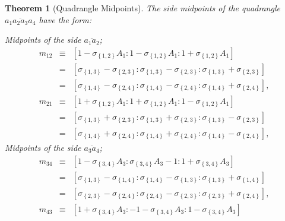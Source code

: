\documentclass{unswthesis}
\newtheorem{theorem}{Theorem}
\begin{document}
\begin{theorem}[Quadrangle Midpoints]
The side midpoints of the quadrangle $\overline{a_{1}a_{2}a_{3}a_{4}}$ have
the form:

Midpoints of the side $\overline{a_{1}a_{2}}$;%
\begin{eqnarray*}
m_{12} &\equiv &\left[ 1-\sigma _{\left\{ 1,2\right\} }A_{1}:1-\sigma
_{\left\{ 1,2\right\} }A_{1}:1+\sigma _{\left\{ 1,2\right\} }A_{1}\right]  \\
&=&\left[ \sigma _{\left\{ 1,3\right\} }-\sigma _{\left\{ 2,3\right\}
}:\sigma _{\left\{ 1,3\right\} }-\sigma _{\left\{ 2,3\right\} }:\sigma
_{\left\{ 1,3\right\} }+\sigma _{\left\{ 2,3\right\} }\right]  \\
&=&\left[ \sigma _{\left\{ 1,4\right\} }-\sigma _{\left\{ 2,4\right\}
}:\sigma _{\left\{ 1,4\right\} }-\sigma _{\left\{ 2,4\right\} }:\sigma
_{\left\{ 1,4\right\} }+\sigma _{\left\{ 2,4\right\} }\right] , \\
m_{21} &\equiv &\left[ 1+\sigma _{\left\{ 1,2\right\} }A_{1}:1+\sigma
_{\left\{ 1,2\right\} }A_{1}:1-\sigma _{\left\{ 1,2\right\} }A_{1}\right]  \\
&=&\left[ \sigma _{\left\{ 1,3\right\} }+\sigma _{\left\{ 2,3\right\}
}:\sigma _{\left\{ 1,3\right\} }+\sigma _{\left\{ 2,3\right\} }:\sigma
_{\left\{ 1,3\right\} }-\sigma _{\left\{ 2,3\right\} }\right]  \\
&=&\left[ \sigma _{\left\{ 1,4\right\} }+\sigma _{\left\{ 2,4\right\}
}:\sigma _{\left\{ 1,4\right\} }+\sigma _{\left\{ 2,4\right\} }:\sigma
_{\left\{ 1,4\right\} }-\sigma _{\left\{ 2,4\right\} }\right] ,
\end{eqnarray*}%
Midpoints of the side $\overline{a_{3}a_{4}}$;%
\begin{eqnarray*}
m_{34} &\equiv &\left[ 1-\sigma _{\left\{ 3,4\right\} }A_{3}:\sigma
_{\left\{ 3,4\right\} }A_{3}-1:1+\sigma _{\left\{ 3,4\right\} }A_{3}\right] 
\\
&=&\left[ \sigma _{\left\{ 1,3\right\} }-\sigma _{\left\{ 1,4\right\}
}:\sigma _{\left\{ 1,4\right\} }-\sigma _{\left\{ 1,3\right\} }:\sigma
_{\left\{ 1,3\right\} }+\sigma _{\left\{ 1,4\right\} }\right]  \\
&=&\left[ \sigma _{\left\{ 2,3\right\} }-\sigma _{\left\{ 2,4\right\}
}:\sigma _{\left\{ 2,4\right\} }-\sigma _{\left\{ 2,3\right\} }:\sigma
_{\left\{ 2,3\right\} }+\sigma _{\left\{ 2,4\right\} }\right] , \\
m_{43} &\equiv &\left[ 1+\sigma _{\left\{ 3,4\right\} }A_{3}:-1-\sigma
_{\left\{ 3,4\right\} }A_{3}:1-\sigma _{\left\{ 3,4\right\} }A_{3}\right]  \\

\end{eqnarray*}
\end{theorem}
\end{document}
